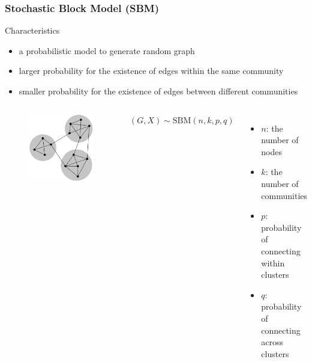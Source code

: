 \documentclass[notheorems]{beamer}
\begin{document}
\begin{frame}
\frametitle{Stochastic Block Model (SBM)}
\begin{block}{Characteristics}
\begin{itemize}
\item a probabilistic model to generate random graph
\item larger probability for the existence of edges within the same community
\item smaller probability for the existence of edges between different communities
\end{itemize}
\end{block}
\begin{columns}
		\begin{figure}
		\includegraphics[width=\textwidth]{sbm.png}
	\end{figure}
$(G,X)\sim \textrm{SBM}(n, k, p, q)$
\begin{itemize}
	\item $n$: the number of nodes
	\item $k$: the number of communities
	\item $p$: probability of connecting within clusters
	\item $q$: probability of connecting across clusters
\end{itemize}
\end{columns}
\end{frame}
\end{document}
